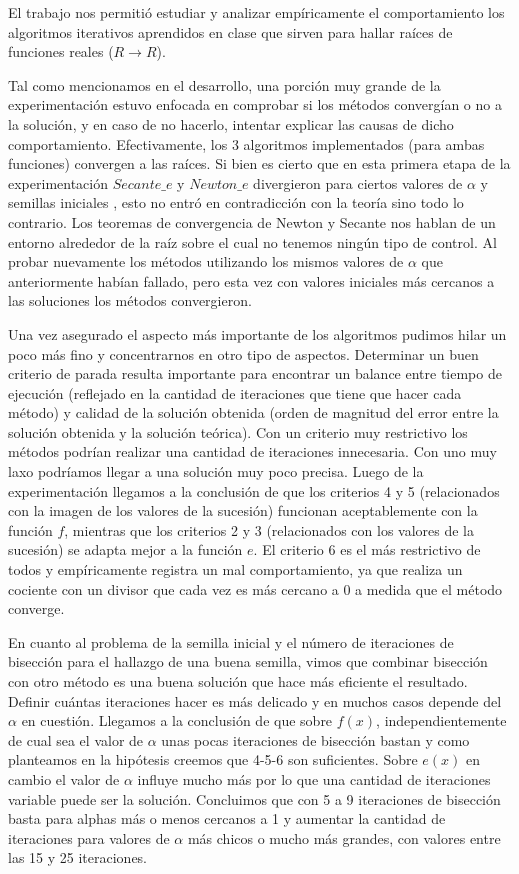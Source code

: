 El trabajo nos permitió estudiar y analizar empíricamente el comportamiento los algoritmos iterativos aprendidos en clase que sirven para hallar raíces de funciones reales ($R \rightarrow R$).

Tal como mencionamos en el desarrollo, una porción muy grande de la experimentación estuvo enfocada en comprobar si los métodos convergían o no a la solución, y en caso de no hacerlo, intentar explicar las
causas de dicho comportamiento. Efectivamente, los 3 algoritmos implementados (para ambas funciones) convergen a las raíces. Si bien es cierto que en esta primera etapa de la experimentación $Secante\_e$ y
$Newton\_e$ divergieron para ciertos valores de $\alpha$ y semillas iniciales , esto no entró en contradicción con la teoría sino todo lo contrario.
Los teoremas de convergencia de Newton y Secante nos hablan de un entorno alrededor de la raíz sobre el cual no tenemos ningún tipo de control. Al probar nuevamente los métodos utilizando los mismos valores 
de $\alpha$ que anteriormente habían fallado, pero esta vez con valores iniciales más cercanos a las soluciones los métodos convergieron.

Una vez asegurado el aspecto más importante de los algoritmos pudimos hilar un poco más fino y concentrarnos en otro tipo de aspectos. Determinar un buen criterio de parada resulta importante para encontrar un
balance entre tiempo de ejecución (reflejado en la cantidad de iteraciones que tiene que hacer cada método) y calidad de la solución obtenida (orden de magnitud del error entre la solución obtenida y la
solución teórica). Con un criterio muy restrictivo los métodos podrían realizar una cantidad de iteraciones innecesaria. Con uno muy laxo podríamos llegar a una solución muy poco precisa. Luego de la 
experimentación llegamos a la conclusión de que los criterios 4 y 5 (relacionados con la imagen de los valores de la sucesión) funcionan aceptablemente con la función $f$, mientras que los criterios 2 y 3
(relacionados con los valores de la sucesión) se adapta mejor a la función $e$. El criterio 6 es el más restrictivo de todos y empíricamente registra un mal comportamiento, ya que realiza un cociente con 
un divisor que cada vez es más cercano a 0 a medida que el método converge.

En cuanto al problema de la semilla inicial y el número de iteraciones de bisección para el hallazgo de una buena semilla, vimos que combinar bisección con otro método es una buena solución que hace más eficiente el resultado. Definir cuántas iteraciones hacer es más delicado y en muchos casos depende del $\alpha$ en cuestión. 
Llegamos a la conclusión de que sobre $f(x)$, independientemente de cual sea el valor de $\alpha$ unas pocas iteraciones de bisección bastan y como planteamos en la hipótesis creemos que 4-5-6 son suficientes.
Sobre $e(x)$ en cambio el valor de $\alpha$ influye mucho más por lo que una cantidad de iteraciones variable puede ser la solución. Concluimos que con 5 a 9 iteraciones de bisección basta para alphas más o menos cercanos a 1 y aumentar la cantidad de iteraciones para valores de $\alpha$ más chicos o mucho más grandes, con valores entre las 15 y 25 iteraciones.

